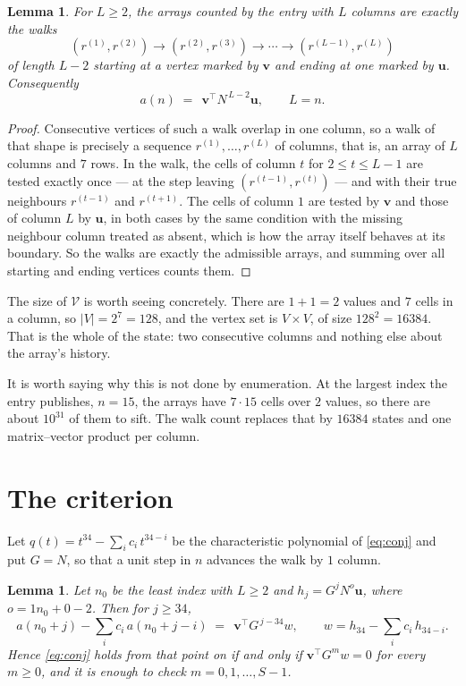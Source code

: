 \documentclass[11pt,a4paper]{article}
\theoremstyle{plain}
\newtheorem{lemma}[theorem]{Lemma}
\theoremstyle{definition}
\begin{document}
\begin{lemma}\label{lem:walk}
For $L\ge2$, the arrays counted by the entry with $L$ columns are exactly the walks
\[
(r^{(1)},r^{(2)})\to(r^{(2)},r^{(3)})\to\cdots\to(r^{(L-1)},r^{(L)})
\]
of length $L-2$ starting at a vertex marked by $\mathbf{v}$ and ending at one marked by
$\mathbf{u}$. Consequently
\[
a(n)\;=\;\,\mathbf{v}^{\!\top}N^{\,L-2}\mathbf{u},\qquad L=n .
\]
\end{lemma}

\begin{proof}
Consecutive vertices of such a walk overlap in one column, so a walk of that shape is
precisely a sequence $r^{(1)},\dots,r^{(L)}$ of columns, that is, an array of $L$ columns
and $7$ rows. In the walk, the cells of column $t$ for $2\le t\le L-1$ are tested
exactly once --- at the step leaving $(r^{(t-1)},r^{(t)})$ --- and with their true
neighbours $r^{(t-1)}$ and $r^{(t+1)}$. The cells of column $1$ are tested by
$\mathbf{v}$ and those of column $L$ by $\mathbf{u}$, in both cases by the same condition
with the missing neighbour column treated as absent, which is how the array itself behaves at
its boundary. So the walks are exactly the admissible arrays, and summing over all starting
and ending vertices counts them.
\end{proof}


The size of $\mathcal V$ is worth seeing concretely. There are $1+1=2$ values
and $7$ cells in a column, so $|V|=2^{7}=128$, and the vertex set is
$V\times V$, of size $128^2=16384$. That is the whole of the state: two consecutive
columns and nothing else about the array's history.

It is worth saying why this is not done by enumeration. At the largest index the entry
publishes, $n=15$, the arrays have $7\cdot15$ cells over
$2$ values, so there are about $10^{31}$ of them to sift. The
walk count replaces that by $16384$ states and one matrix--vector product per column.
\section{The criterion}

Let $q(t)=t^{34}-\sum_i c_i\,t^{34-i}$ be the characteristic polynomial of
\eqref{eq:conj} and put $G=N$, so that a unit step in $n$ advances the walk by
$1$ column.

\begin{lemma}\label{lem:crit}
Let $n_0$ be the least index with $L\ge2$ and $h_j=G^{j}N^{o}\mathbf{u}$, where
$o=1n_0+0-2$. Then for $j\ge34$,
\[
a(n_0+j)-\sum_i c_i\,a(n_0+j-i)\;=\;\,\mathbf{v}^{\!\top}G^{\,j-34}w,
\qquad w=h_{34}-\sum_i c_i\,h_{34-i} .
\]
Hence \eqref{eq:conj} holds from that point on if and only if
$\mathbf{v}^{\!\top}G^{m}w=0$ for every $m\ge0$, and it is enough to check
$m=0,1,\dots,S-1$.
\end{lemma}
\end{document}
